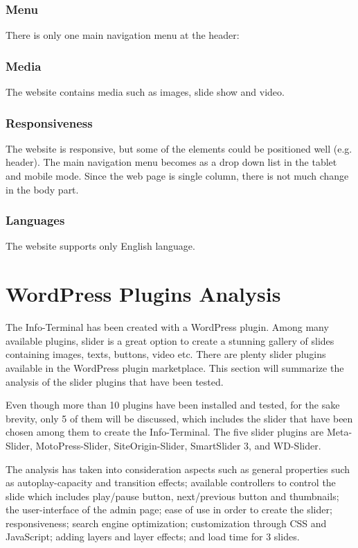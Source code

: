 \subsubsection*{Menu}
There is only one main navigation menu at the header:

\subsubsection*{Media}
The website contains media such as images, slide show and video.

\subsubsection*{Responsiveness}
The website is responsive, but some of the elements could be positioned well (e.g. header). The main navigation menu becomes as a drop down list in the tablet and mobile mode. Since the web page is single column, there is not much change in the body part.

\subsubsection*{Languages}
The website supports only English language.


\section{WordPress Plugins Analysis}
The Info-Terminal has been created with a WordPress plugin. Among many available plugins, slider is a great option to create a stunning gallery of slides containing images, texts, buttons, video etc. There are plenty slider plugins available in the WordPress plugin marketplace. This section will summarize the analysis of the slider plugins that have been tested.

Even though more than 10 plugins have been installed and tested, for the sake brevity, only 5 of them will be discussed, which includes the slider that have been chosen among them to create the Info-Terminal. The five slider plugins are Meta-Slider, MotoPress-Slider, SiteOrigin-Slider, SmartSlider 3, and WD-Slider.

The analysis has taken into consideration aspects such as general properties such as autoplay-capacity and transition effects; available controllers to control the slide which includes play/pause button, next/previous button and thumbnails; the user-interface of the admin page; ease of use in order to create the slider; responsiveness; search engine optimization; customization through CSS and JavaScript; adding layers and layer effects; and load time for 3 slides.

